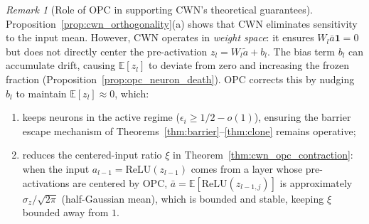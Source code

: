 \documentclass{article}
\providecommand{\E}{\mathbb{E}}
\theoremstyle{plain}
\theoremstyle{definition}
\theoremstyle{remark}
\newtheorem{remark}{Remark}
\begin{document}
\begin{remark}[Role of OPC in supporting CWN's theoretical guarantees]
\label{rem:opc_supports_cwn}
Proposition~\ref{prop:cwn_orthogonality}(a) shows that CWN eliminates sensitivity to the input mean. However, CWN operates in \emph{weight space}: it ensures $W_l\bar{a}\mathbf{1} = 0$ but does not directly center the pre-activation $z_l = W_l\tilde{a} + b_l$. The bias term $b_l$ can accumulate drift, causing $\E[z_l]$ to deviate from zero and increasing the frozen fraction (Proposition~\ref{prop:opc_neuron_death}). OPC corrects this by nudging $b_l$ to maintain $\E[z_l] \approx 0$, which:
\begin{enumerate}
    \item[(i)] keeps neurons in the active regime ($\epsilon_i \geq 1/2 - o(1)$), ensuring the barrier escape mechanism of Theorems~\ref{thm:barrier}--\ref{thm:clone} remains operative;
    \item[(ii)] reduces the centered-input ratio $\xi$ in Theorem~\ref{thm:cwn_opc_contraction}: when the input $a_{l-1} = \mathrm{ReLU}(z_{l-1})$ comes from a layer whose pre-activations are centered by OPC, $\bar{a} = \E[\mathrm{ReLU}(z_{l-1,j})]$ is approximately $\sigma_{z}/\sqrt{2\pi}$ (half-Gaussian mean), which is bounded and stable, keeping $\xi$ bounded away from $1$.
\end{enumerate}
\end{remark}
\end{document}
